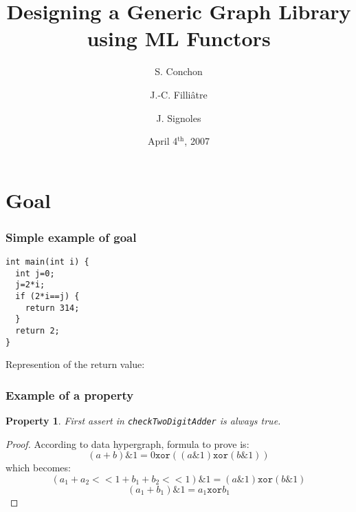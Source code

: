 \documentclass{beamer}
\title{Designing a Generic Graph Library using ML Functors}
\author{S. Conchon \and J.-C. Filli\^atre \and J. Signoles}
\date{April 4$^{\mbox{th}}$, 2007}
\begin{document}

\newtheorem{prop}{Property}

\frame{\titlepage}

\section[Outline]{}
\frame{\tableofcontents}

\section{Goal}




\begin{frame}[containsverbatim]
  \frametitle{Simple example of goal}
\begin{minipage}{5cm}
\begin{verbatim}
int main(int i) {
  int j=0;
  j=2*i;
  if (2*i==j) {
    return 314;
  }
  return 2;
}
\end{verbatim}
\end{minipage}
\begin{minipage}{5cm}

Represention of the return value:
\begin{center}
\end{center}
\end{minipage}
\end{frame}

\begin{frame}[containsverbatim]
  \frametitle{Example of a property}
\begin{prop}
First assert in {\tt checkTwoDigitAdder} is always true.
\end{prop}
\begin{proof}
According to data hypergraph, formula to prove is:
$$(a+b)\& 1 = 0 \mathtt{xor} ( (a\& 1) \mathtt{xor} (b\& 1))$$
which becomes:
$$(a_1+a_2<<1 + b_1+b_2<<1)\& 1 =  (a\& 1) \mathtt{xor} (b\& 1)$$
$$(a_1+ b_1)\& 1 =  a_1 \mathtt{xor} b_1$$
\end{proof}
\end{frame}
\end{document}
